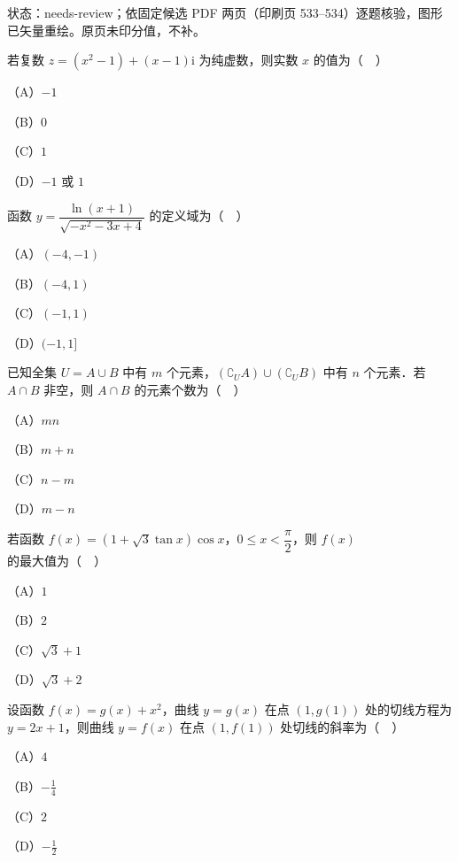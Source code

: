 

状态：needs-review；依固定候选 PDF 两页（印刷页 533–534）逐题核验，图形已矢量重绘。原页未印分值，不补。


\begin{question}
若复数 $z=(x^2-1)+(x-1)\mathrm i$ 为纯虚数，则实数 $x$ 的值为（　）

（A）$-1$

（B）$0$

（C）$1$

（D）$-1$ 或 $1$

\end{question}
\begin{question}
函数 $y=\dfrac{\ln(x+1)}{\sqrt{-x^2-3x+4}}$ 的定义域为（　）

（A）$(-4,-1)$

（B）$(-4,1)$

（C）$(-1,1)$

（D）$(-1,1]$

\end{question}
\begin{question}
已知全集 $U=A\cup B$ 中有 $m$ 个元素，$(\complement_U A)\cup(\complement_U B)$ 中有 $n$ 个元素．若 $A\cap B$ 非空，则 $A\cap B$ 的元素个数为（　）

（A）$mn$

（B）$m+n$

（C）$n-m$

（D）$m-n$

\end{question}
\begin{question}
若函数 $f(x)=(1+\sqrt3\tan x)\cos x$，$0\leqslant x<\dfrac{\pi}{2}$，则 $f(x)$ 的最大值为（　）

（A）$1$

（B）$2$

（C）$\sqrt3+1$

（D）$\sqrt3+2$

\end{question}
\begin{question}
设函数 $f(x)=g(x)+x^2$，曲线 $y=g(x)$ 在点 $(1,g(1))$ 处的切线方程为 $y=2x+1$，则曲线 $y=f(x)$ 在点 $(1,f(1))$ 处切线的斜率为（　）

（A）$4$

（B）$-\frac14$

（C）$2$

（D）$-\frac12$

\end{question}
